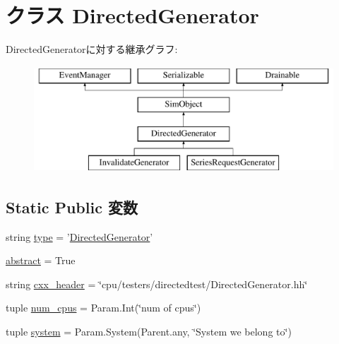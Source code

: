 \hypertarget{classRubyDirectedTester_1_1DirectedGenerator}{
\section{クラス DirectedGenerator}
\label{classRubyDirectedTester_1_1DirectedGenerator}
}
DirectedGeneratorに対する継承グラフ:\begin{figure}[H]
\begin{center}
\leavevmode
\includegraphics[height=4cm]{classRubyDirectedTester_1_1DirectedGenerator}
\end{center}
\end{figure}
\subsection*{Static Public 変数}
\begin{DoxyCompactItemize}
\item 
string \hyperlink{classRubyDirectedTester_1_1DirectedGenerator_acce15679d830831b0bbe8ebc2a60b2ca}{type} = '\hyperlink{classRubyDirectedTester_1_1DirectedGenerator}{DirectedGenerator}'
\item 
\hyperlink{classRubyDirectedTester_1_1DirectedGenerator_a17fa61ac3806b481cafee5593b55e5d0}{abstract} = True
\item 
string \hyperlink{classRubyDirectedTester_1_1DirectedGenerator_a17da7064bc5c518791f0c891eff05fda}{cxx\_\-header} = \char`\"{}cpu/testers/directedtest/DirectedGenerator.hh\char`\"{}
\item 
tuple \hyperlink{classRubyDirectedTester_1_1DirectedGenerator_ab0bd6c2c9c8cc012f980111834ffc3a9}{num\_\-cpus} = Param.Int(\char`\"{}num of cpus\char`\"{})
\item 
tuple \hyperlink{classRubyDirectedTester_1_1DirectedGenerator_ab737471139f5a296e5b26e8a0e1b0744}{system} = Param.System(Parent.any, \char`\"{}System we belong to\char`\"{})
\end{DoxyCompactItemize}


